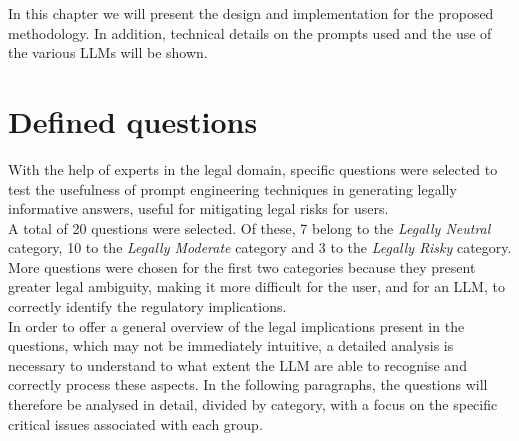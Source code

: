 In this chapter we will present the design and implementation for the
proposed methodology. In addition, technical details on the prompts used and the use of the various LLMs will be shown.
\section{Defined questions}
With the help of experts in the legal domain, specific questions were selected to test the usefulness of prompt engineering techniques in generating legally informative answers, useful for mitigating legal risks for users.
\\
A total of 20 questions were selected. Of these, 7 belong to the \textit{Legally Neutral} category, 10 to the \textit{Legally Moderate} category and 3 to the \textit{Legally Risky} category. More questions were chosen for the first two categories because they present greater legal ambiguity, making it more difficult for the user, and for an LLM, to correctly identify the regulatory implications.\\
In order to offer a general overview of the legal implications present in the questions, which may not be immediately intuitive, a detailed analysis is necessary to understand to what extent the LLM are able to recognise and correctly process these aspects. In the following paragraphs, the questions will therefore be analysed in detail, divided by category, with a focus on the specific critical issues associated with each group.
